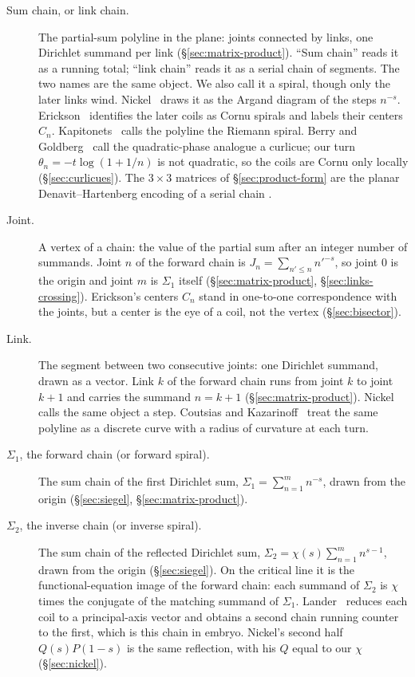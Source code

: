 \documentclass[11pt]{article}
\theoremstyle{definition}
\begin{document}
\begin{description}
\item[Sum chain, or link chain.]
The partial-sum polyline in the plane: joints connected by links,
one Dirichlet summand per link
(\S\ref{sec:matrix-product}).
``Sum chain'' reads it as a running total; ``link chain'' reads it
as a serial chain of segments. The two names are the same object.
We also call it a spiral, though only the later links wind.
Nickel~\cite{Nickel2013} draws it as the Argand diagram of the
steps $n^{-s}$.
Erickson~\cite{Erickson2005} identifies the later coils as Cornu
spirals and labels their centers $C_n$.
Kapitonets~\cite{Kapitonets2019} calls the polyline the Riemann
spiral.
Berry and Goldberg~\cite{BerryGoldberg1988} call the quadratic-phase
analogue a curlicue; our turn $\theta_n=-t\log(1+1/n)$ is not
quadratic, so the coils are Cornu only locally
(\S\ref{sec:curlicues}).
The $3\times3$ matrices of \S\ref{sec:product-form} are the planar
Denavit--Hartenberg encoding of a serial chain
\cite{DenavitHartenberg1955}.

\item[Joint.]
A vertex of a chain: the value of the partial sum after an integer
number of summands.
Joint $n$ of the forward chain is $J_n=\sum_{n'\le n}n'^{-s}$, so
joint $0$ is the origin and joint $m$ is $\Sigma_1$ itself
(\S\ref{sec:matrix-product}, \S\ref{sec:links-crossing}).
Erickson's centers $C_n$ stand in one-to-one correspondence with the
joints, but a center is the eye of a coil, not the vertex
(\S\ref{sec:bisector}).

\item[Link.]
The segment between two consecutive joints: one Dirichlet summand,
drawn as a vector.
Link $k$ of the forward chain runs from joint $k$ to joint $k+1$ and
carries the summand $n=k+1$
(\S\ref{sec:matrix-product}).
Nickel calls the same object a step.
Coutsias and Kazarinoff~\cite{CoutsiasKazarinoff1987} treat the same
polyline as a discrete curve with a radius of curvature at each turn.

\item[$\Sigma_1$, the forward chain (or forward spiral).]
The sum chain of the first Dirichlet sum,
$\Sigma_1=\sum_{n=1}^{m}n^{-s}$, drawn from the origin
(\S\ref{sec:siegel}, \S\ref{sec:matrix-product}).

\item[$\Sigma_2$, the inverse chain (or inverse spiral).]
The sum chain of the reflected Dirichlet sum,
$\Sigma_2=\chi(s)\sum_{n=1}^{m}n^{s-1}$, drawn from the origin
(\S\ref{sec:siegel}).
On the critical line it is the functional-equation image of the
forward chain: each summand of $\Sigma_2$ is $\chi$ times the
conjugate of the matching summand of $\Sigma_1$.
Lander~\cite{Lander2017,Lander2018} reduces each coil to a
principal-axis vector and obtains a second chain running counter to
the first, which is this chain in embryo.
Nickel's second half $Q(s)P(1-s)$ is the same reflection, with his
$Q$ equal to our $\chi$ (\S\ref{sec:nickel}).
\end{description}
\end{document}
